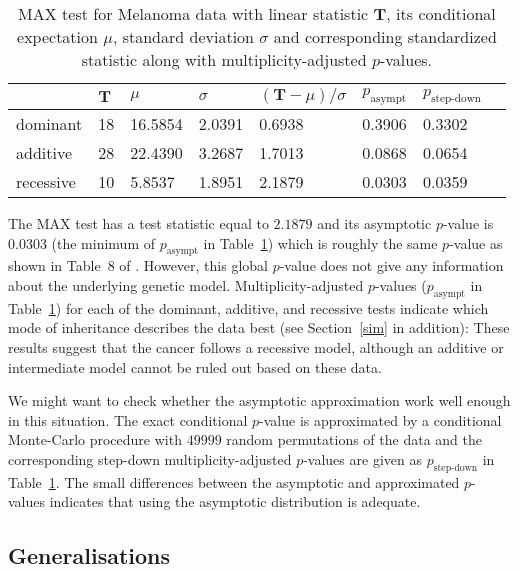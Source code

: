 \documentclass[bimj,fleqn]{w-art}
\newcommand{\T}{\mathbf{T}}
\begin{document}
\begin{table}
\begin{center}
\caption{MAX test for Melanoma data with linear statistic
         $\T$, its conditional expectation $\mu$, standard deviation 
         $\sigma$ and corresponding standardized statistic along with 
         multiplicity-adjusted $p$-values. \label{melres}}
\vspace*{0.5cm}
\begin{tabular}{l l l l l l l l}
 & $\T$ & $\mu$ & $ \sigma$ & $(\T - \mu) / \sigma$ & $p_\text{asympt}$ & $p_\text{step-down}$ \\ \hline
dominant  &  18 & 16.5854 & 2.0391 & 0.6938 & 0.3906 & 0.3302 \\ 
additive  &  28 & 22.4390 & 3.2687 & 1.7013 & 0.0868 & 0.0654 \\ 
recessive  &  10 & 5.8537 & 1.8951 & 2.1879 & 0.0303 & 0.0359 \\ \hline
\end{tabular}
\end{center}
\end{table}


The MAX test has a test statistic equal to 
$2.1879$  and its asymptotic $p$-value 
is 0.0303 (the minimum of $p_\text{asympt}$ in
Table~\ref{melres})
which is roughly the same $p$-value as shown in Table~8 of \citet{Freidlin:2002}.
However, this global $p$-value does not give any information about the
underlying genetic model. Multiplicity-adjusted $p$-values
($p_\text{asympt}$ in Table~\ref{melres})
for each of the dominant, additive, and recessive tests indicate
which mode of inheritance describes the data best
(see Section~\ref{sim} in addition):
These results suggest that the cancer follows a recessive model, although
an additive or intermediate model cannot be ruled out based on these data.

We might want to check whether the asymptotic approximation work well enough
in this situation. The exact conditional
$p$-value is approximated by a conditional Monte-Carlo procedure
with $49999$ random permutations of the data and the corresponding
step-down multiplicity-adjusted $p$-values \citep{WestfallYoung1993}
are given as $p_\text{step-down}$ in Table~\ref{melres}. The small
differences between the asymptotic and approximated $p$-values 
indicates that using the asymptotic distribution is adequate.

\subsection{Generalisations}
\end{document}
